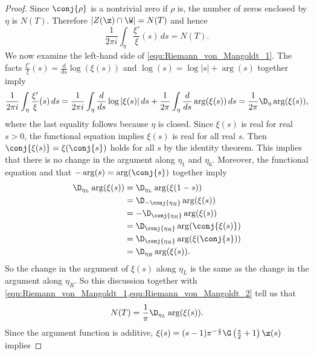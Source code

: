 \begin{proof}
        Since $\conj{\rho}$ is a nontrivial zero if $\rho$ is, the number of zeros enclosed by $\eta$ is $N(T)$. Therefore $|Z(\z) \cap \W| = N(T)$ and hence
        \begin{equation}\label{equ:Riemann_von_Mangoldt_1}
          \frac{1}{2\pi i}\int_{\eta}\frac{\xi'}{\xi}(s)\,ds = N(T).
        \end{equation}
        We now examine the left-hand side of \cref{equ:Riemann_von_Mangoldt_1}. The facts $\frac{\xi'}{\xi}(s) = \frac{d}{ds}\log(\xi(s))$ and $\log(s) = \log|s|+\arg(s)$ together imply
        \begin{equation}\label{equ:Riemann_von_Mangoldt_2}
          \frac{1}{2\pi i}\int_{\eta}\frac{\xi'}{\xi}(s)\,ds = \frac{1}{2\pi i}\int_{\eta}\frac{d}{ds}\log|\xi(s)|\,ds+\frac{1}{2\pi }\int_{\eta}\frac{d}{ds}\arg(\xi(s))\,ds = \frac{1}{2\pi}\D_{\eta}\arg(\xi(s)),
        \end{equation}
        where the last equality follows because $\eta$ is closed. Since $\xi(s)$ is real for real $s > 0$, the functional equation implies $\xi(s)$ is real for all real $s$. Then $\conj{\xi(s)} = \xi(\conj{s})$ holds for all $s$ by the identity theorem. This implies that there is no change in the argument along $\eta_{1}$ and $\eta_{6}$. Moreover, the functional equation and that $-\arg(s) = \arg(\conj{s})$ together imply
        \begin{align*}
          \D_{\eta_{L}}\arg(\xi(s)) &= \D_{\eta_{L}}\arg(\xi(1-s)) \\
          &= \D_{-\conj{\eta_{R}}}\arg(\xi(s)) \\
          &= -\D_{\conj{\eta_{R}}}\arg(\xi(s)) \\
          &= \D_{\conj{\eta_{R}}}\arg(\conj{\xi(s)}) \\
          &= \D_{\conj{\eta_{R}}}\arg(\xi(\conj{s})) \\
          &= \D_{{\eta_{R}}}\arg(\xi(s)).
        \end{align*}
        So the change in the argument of $\xi(s)$ along $\eta_{L}$ is the same as the change in the argument along $\eta_{R}$. So this discussion together with \cref{equ:Riemann_von_Mangoldt_1,equ:Riemann_von_Mangoldt_2} tell us that
        \begin{equation}\label{equ:Riemann_von_Mangoldt_3}
          N(T) = \frac{1}{\pi}\D_{\eta_{L}}\arg(\xi(s)).
        \end{equation}
        Since the argument function is additive, $\xi(s) = (s-1)\pi^{-\frac{s}{2}}\G\left(\frac{s}{2}+1\right)\z(s)$ implies 

\end{proof}
